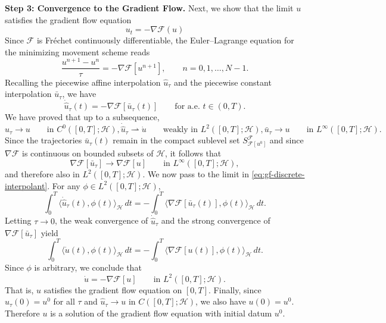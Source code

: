 \documentclass[10pt,a4paper]{amsart}
\renewenvironment{proof}{\par\noindent{\bf Proof\ }}{\hfill\BlackBoxProof\par\medskip}
\begin{document}
\begin{proof}
\noindent \textbf{Step 3: Convergence to the Gradient Flow.} Next, we show that the limit $u$ satisfies the gradient flow equation
\begin{equation}
u_t = - \nabla \mathcal{F}(u)
\end{equation}
Since $\mathcal F$ is Fr\'echet continuously differentiable, the Euler--Lagrange equation for the minimizing movement scheme reads
\[
\frac{u^{n+1}-u^n}{\tau}=-\nabla\mathcal F[u^{n+1}],
\qquad n=0,1,\dots,N-1.
\]
Recalling the piecewise affine interpolation $\hat u_\tau$ and the piecewise constant interpolation $\bar u_\tau$, we have
\begin{equation}\label{eq:gf-discrete-interpolant}
\dot{\hat u}_\tau(t)=-\nabla\mathcal F[\bar u_\tau(t)]
\qquad \text{for a.e. } t\in(0,T).
\end{equation}
We have proved that up to a subsequence,
\[
\hat u_\tau \to u \qquad \text{in } C^0([0,T];\mathcal H), \dot{\hat u}_\tau \rightharpoonup \dot u
\qquad \text{weakly in } L^2([0,T];\mathcal H), \bar u_\tau \to u
\qquad \text{in } L^\infty([0,T];\mathcal H).
\]
Since the trajectories $\bar u_\tau(t)$ remain in the compact sublevel set
\(
S_{\mathcal F[u^0]}^{\mathcal F} \)
and since $\nabla\mathcal F$ is continuous on bounded subsets of $\mathcal H$, it follows that
\[
\nabla\mathcal F[\bar u_\tau]\to \nabla\mathcal F[u]
\qquad \text{in } L^\infty([0,T];\mathcal H),
\]
and therefore also in $L^2([0,T];\mathcal H)$. We now pass to the limit in \eqref{eq:gf-discrete-interpolant}. For any $\phi\in L^2([0,T];\mathcal H)$,
\[
\int_0^T \langle \dot{\hat u}_\tau(t),\phi(t)\rangle_{\mathcal H}\,dt
=
-\int_0^T \langle \nabla\mathcal F[\bar u_\tau(t)],\phi(t)\rangle_{\mathcal H}\,dt.
\]
Letting $\tau\to0$, the weak convergence of $\dot{\hat u}_\tau$ and the strong convergence of $\nabla\mathcal F[\bar u_\tau]$ yield
\[
\int_0^T \langle \dot u(t),\phi(t)\rangle_{\mathcal H}\,dt
=
-\int_0^T \langle \nabla\mathcal F[u(t)],\phi(t)\rangle_{\mathcal H}\,dt.
\]
Since $\phi$ is arbitrary, we conclude that
\[
\dot u=-\nabla\mathcal F[u]
\qquad \text{in } L^2([0,T];\mathcal H).
\]
That is, $u$ satisfies the gradient flow equation on $[0,T]$. Finally, since $\hat u_\tau(0)=u^0$ for all $\tau$ and $\hat u_\tau\to u$ in $C([0,T];\mathcal H)$, we also have
\(
u(0)=u^0.
\)
Therefore $u$ is a solution of the gradient flow equation with initial datum $u^0$.



\end{proof}
\end{document}
